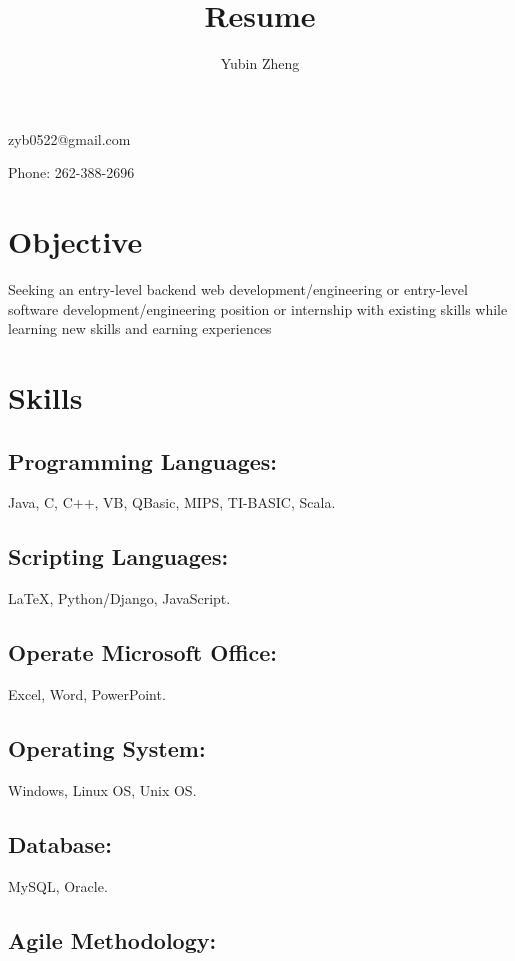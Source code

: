 \documentclass{article}
\makeatletter
\renewcommand{\maketitle}
{
\begin{center}
{\huge\bfseries
\theauthor}

\vspace{.25em}

zyb0522@gmail.com

Phone: 262-388-2696
\end{center}
}
\newcommand{\schoolitem}[4]{
\begin{tabular*}{\textwidth}{l@{\extracolsep{\fill}}r}
  #1   &      #2 \\
  #3 &   #4 \\
\end{tabular*}
}
\makeatother
\begin{document}
\title{Resume}
\author{Yubin Zheng}
\maketitle
\section{Objective}
{Seeking an entry-level backend web development/engineering or entry-level software development/engineering position or internship with existing skills while learning new skills and earning experiences}

\section{Skills}

\subsection{Programming Languages:}

Java, C, C++, VB, QBasic, MIPS, TI-BASIC, Scala.

\subsection{Scripting Languages:}

{\LaTeX}, Python/Django, JavaScript.

\subsection{Operate Microsoft Office:}

Excel, Word, PowerPoint.

\subsection{Operating System:}

Windows, Linux OS, Unix OS.

\subsection{Database:}

MySQL, Oracle.

\subsection{Agile Methodology:}
\end{document}
